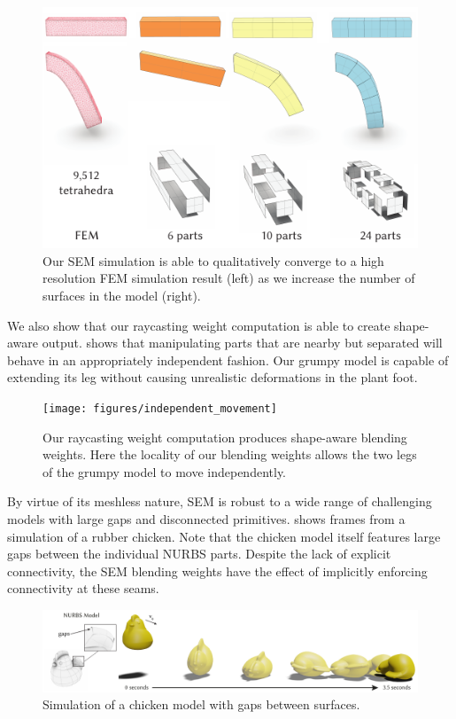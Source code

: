 \begin{figure}[h]
  \includegraphics[width=\columnwidth]{figures/beams.pdf}
  \caption{Our SEM simulation is able to qualitatively converge to a high resolution FEM simulation result (left) as we increase the number of surfaces in the model (right). }
  \label{fig:convergence}
\end{figure}

We also show that our raycasting weight computation is able to create shape-aware output.  shows that manipulating
parts that are nearby but separated will behave in an appropriately independent fashion. Our grumpy model is capable of extending 
its leg without causing unrealistic deformations in the plant foot.

\begin{figure}[h]
  \texttt{[image: figures/independent\_movement]}
  \caption{Our raycasting weight computation produces shape-aware blending weights. Here the locality of our blending weights allows the two legs of the grumpy model to move independently. }
  \label{fig:independence}
\end{figure}

By virtue of its meshless nature, SEM is robust to a wide range of challenging models with large gaps and disconnected primitives.
 shows frames from a simulation of a rubber chicken. Note that the chicken model itself features large gaps between the individual NURBS parts. 
Despite the lack of explicit connectivity, the SEM blending weights have the effect of implicitly enforcing connectivity at these seams. 

\begin{figure}[htp]
  \includegraphics[width=\textwidth]{figures/chicken.pdf}
  \caption{Simulation of a chicken model with gaps between surfaces.}
  \label{fig:chicken}
\end{figure}

